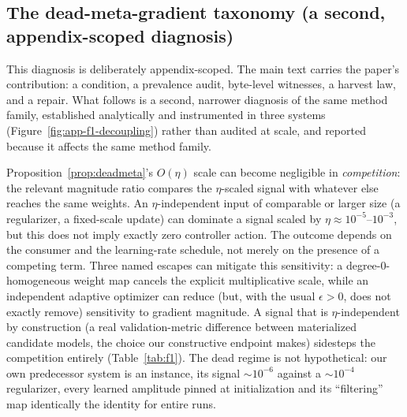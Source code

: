 \subsection{The dead-meta-gradient taxonomy (a second, appendix-scoped
diagnosis)}
\label{sec:deadmeta-taxonomy}

This diagnosis is deliberately appendix-scoped. The main text carries the
paper's contribution: a condition, a prevalence audit, byte-level witnesses, a
harvest law, and a repair. What follows is a second, narrower
diagnosis of the same method family, established analytically and instrumented
in three systems (Figure~\ref{fig:app-f1-decoupling}) rather than audited at
scale, and reported because it affects the same method family.

Proposition~\ref{prop:deadmeta}'s $O(\eta)$ scale can become negligible in
\emph{competition}: the relevant magnitude ratio compares the $\eta$-scaled
signal with whatever else reaches the same weights. An $\eta$-independent
input of comparable or larger size (a regularizer, a fixed-scale update)
can dominate a signal scaled by $\eta\approx10^{-5}$--$10^{-3}$, but this
does not imply exactly zero controller action. The outcome depends on the
consumer and the learning-rate schedule, not merely on the presence of a
competing term. Three named escapes can mitigate this sensitivity: a degree-0-homogeneous weight map
cancels the explicit multiplicative scale, while an independent adaptive
optimizer can reduce (but, with the usual $\epsilon>0$, does not exactly
remove) sensitivity to gradient magnitude. A signal that is
$\eta$-independent by construction (a real validation-metric difference
between materialized candidate models, the choice our constructive endpoint
makes) sidesteps the competition entirely (Table~\ref{tab:f1}). The dead
regime is not hypothetical: our own predecessor system is an instance, its
signal ${\sim}10^{-6}$ against a ${\sim}10^{-4}$ regularizer, every learned
amplitude pinned at initialization and its ``filtering'' map identically the
identity for entire runs.

